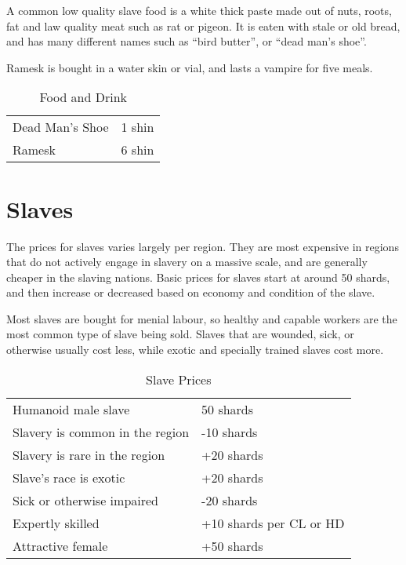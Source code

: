 A common low quality slave food is a white thick paste made out of nuts,
roots, fat and law quality meat such as rat or pigeon. It is eaten with
stale or old bread, and has many different names such as ``bird butter'',
or ``dead man's shoe''.

Ramesk is bought in a water skin or vial, and lasts a vampire for five meals.

\begin{table*}
  \caption{Food and Drink} \label{tbl:Food and Drink}
  \begin{tabular}{p{10cm} l}
    Dead Man's Shoe             &  1 shin \\
    Ramesk                      &  6 shin \\
  \end{tabular}
\end{table*}

\section{Slaves}
\label{sec:Slave Prices}

The prices for slaves varies largely per region. They are most expensive in
regions that do not actively engage in slavery on a massive scale, and are
generally cheaper in the slaving nations. Basic prices for slaves start at
around 50 shards, and then increase or decreased based on economy and
condition of the slave.

Most slaves are bought for menial labour, so healthy and capable workers are
the most common type of slave being sold. Slaves that are wounded, sick, or
otherwise usually cost less, while exotic and specially trained slaves cost
more.

\begin{table*}
  \caption{Slave Prices} \label{tbl:Slave Prices}
  \begin{tabular}{p{10cm} l}
    Humanoid male slave             &  50 shards \\
    Slavery is common in the region & -10 shards \\
    Slavery is rare in the region   & +20 shards \\
    Slave's race is exotic          & +20 shards \\
    Sick or otherwise impaired      & -20 shards \\
    Expertly skilled                & +10 shards per CL or HD \\
    Attractive female               & +50 shards
  \end{tabular}
\end{table*}

